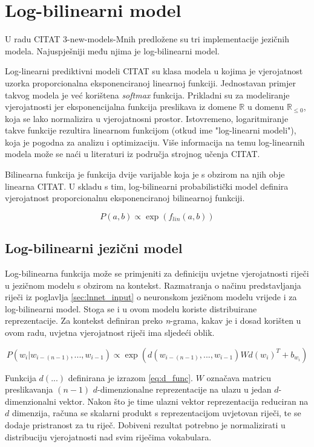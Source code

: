\documentclass[times, utf8, diplomski, numeric]{fer}
\begin{document}
\chapter{Log-bilinearni model}

U radu CITAT 3-new-models-Mnih predložene su tri implementacije jezičnih modela. Najuspješniji među njima je log-bilinearni model.

Log-linearni prediktivni modeli CITAT su klasa modela u kojima je vjerojatnost uzorka proporcionalna eksponenciranoj linearnoj funkciji. Jednostavan primjer takvog modela je već korištena \textit{softmax} funkcija. Prikladni su za modeliranje vjerojatnosti jer eksponencijalna funkcija preslikava iz domene $\mathbb{R}$ u domenu $\mathbb{R}_{\leq 0}$, koja se lako normalizira u vjerojatnosni prostor. Istovremeno, logaritmiranje takve funkcije rezultira linearnom funkcijom (otkud ime "log-linearni modeli"), koja je pogodna za analizu i optimizaciju. Više informacija na temu log-linearnih modela može se naći u literaturi iz područja strojnog učenja CITAT.

Bilinearna funkcija je funkcija dvije varijable koja je s obzirom na njih obje linearna CITAT. U skladu s tim, log-bilinearni probabilistički model definira vjerojatnost proporcionalnu eksponenciranoj bilinearnoj funkciji.

\[
P(a, b) \propto \exp(f_{lin}(a, b))
\]

\section{Log-bilinearni jezični model}

Log-bilinearna funkcija može se primjeniti za definiciju uvjetne vjerojatnosti riječi u jezičnom modelu s obzirom na kontekst. Razmatranja o načinu predstavljanja riječi iz poglavlja \ref{sec:lnnet_input} o neuronskom jezičnom modelu vrijede i za log-bilinearni model. Stoga se i u ovom modelu koriste distribuirane reprezentacije. Za kontekst definiran preko \textit{n}-grama, kakav je i dosad korišten u ovom radu, uvjetna vjerojatnost riječi ima sljedeći oblik.

\begin{equation}
P(w_i | w_{i - (n - 1)}, ... , w_{i - 1}) 
  \propto \exp(d(w_{i - (n - 1)}, ... , w_{i - 1}) W d(w_i)^T + b_{w_i})
\end{equation}

Funkcija $d(...)$ definirana je izrazom \ref{eq:d_func}. $W$ označava matricu preslikavanja $(n - 1)$ $d$-dimenzionalne reprezentacije na ulazu u jedan $d$-dimenzionalni vektor. Nakon što je time ulazni vektor reprezentacija reduciran na $d$ dimenzija, računa se skalarni produkt s reprezentacijom uvjetovan riječi, te se dodaje pristranost za tu riječ. Dobiveni rezultat potrebno je normalizirati u distribuciju vjerojatnosti nad svim riječima vokabulara.
\end{document}

